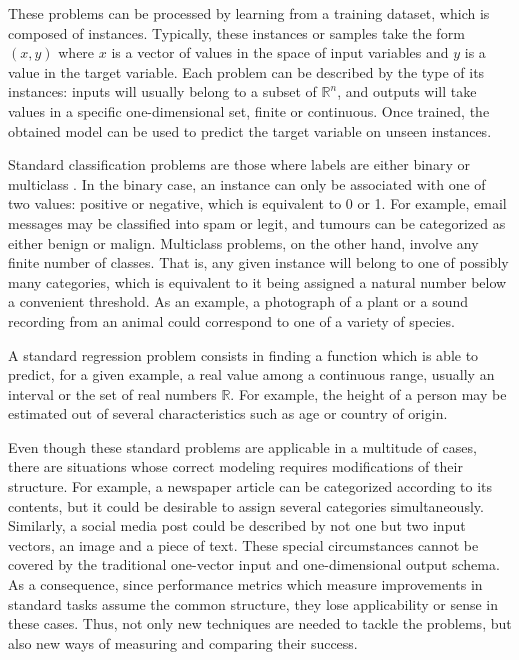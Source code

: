 These problems can be processed by learning from a training dataset, which is composed of instances. Typically, these instances or samples take the form $(x, y)$ where $x$ is a vector of values in the space of input variables and $y$ is a value in the target variable. Each problem can be described by the type of its instances: inputs will usually belong to a subset of $\mathbb R^n$, and outputs will take values in a specific one-dimensional set, finite or continuous. Once trained, the obtained model can be used to predict the target variable on unseen instances.

Standard classification problems are those where labels are either binary or multiclass \cite{classification-duda,multiclass}. In the binary case, an instance can only be associated with one of two values: positive or negative, which is equivalent to 0 or 1. For example, email messages may be classified into spam or legit, and tumours can be categorized as either benign or malign. Multiclass problems, on the other hand, involve any finite number of classes. That is, any given instance will belong to one of possibly many categories, which is equivalent to it being assigned a natural number below a convenient threshold. As an example, a photograph of a plant or a sound recording from an animal could correspond to one of a variety of species. 

A standard regression problem \cite{learning-tibshirani,regression} consists in finding a function which is able to predict, for a given example, a real value among a continuous range, usually an interval or the set of real numbers $\mathbb R$. For example, the height of a person may be estimated out of several characteristics such as age or country of origin.

Even though these standard problems are applicable in a multitude of cases, there are situations whose correct modeling requires modifications of their structure. For example, a newspaper article can be categorized according to its contents, but it could be desirable to assign several categories simultaneously. Similarly, a social media post could be described by not one but two input vectors, an image and a piece of text. These special circumstances cannot be covered by the traditional one-vector input and one-dimensional output schema. As a consequence, since performance metrics which measure improvements in standard tasks assume the common structure, they lose applicability or sense in these cases. Thus, not only new techniques are needed to tackle the problems, but also new ways of measuring and comparing their success.

